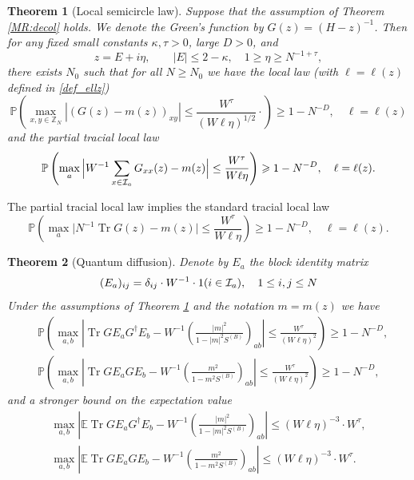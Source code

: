 \documentclass[10pt,reqno]{article}
\DeclareMathOperator{\tr}{Tr}
\theoremstyle{plain} %
\newtheorem{theorem}{Theorem}[section]
\theoremstyle{remark}
\numberwithin{equation}{section}
\begin{document}
 
\begin{theorem}[Local semicircle law]\label{MR:locSC} Suppose that  the assumption of Theorem \ref{MR:decol} holds. We denote the Green's function by 
$ G(z)=(H-z)^{-1}$. 
Then for 
 any fixed small constants $\kappa, \tau>0$, large $D>0$, and 
$$z=E+i\eta,\quad\quad |E|\le  2-\kappa, \quad 1\ge \eta\ge N^{-1+\tau},
$$
there exists $N_0$ such that for all $N \geqslant N_0$  we have the  local law (with $\ell=\ell(z)$ defined in \eqref{def_ellz})
\begin{equation}\label{G_bound}
   \mathbb P\left( \max_{x,y\in \mathbb Z_N}  \left|\left(G(z)-m(z)\right)_{xy}\right|\le  \frac{W^\tau}{(W\ell\eta)^{ 1/2}}\cdot \right)\geqslant 1-N^{-D},\quad \ell=\ell(z) 
\end{equation}
and the partial   tracial  local law
\begin{equation}\label{G_bound_ave}
\mathbb{P}\left(\max_a\Big| W^{-1}\sum_{x\in {\cal I}_a}G_{xx}(z)-m(z) \Big| \le \frac{W^\tau}{W\ell\eta} \right)\geqslant 1-N^{-D},\quad \ell=\ell(z). 
\end{equation}

\end{theorem}
The partial tracial  local law implies  the standard tracial local law 
 $$
\mathbb{P}\left(\max_a\Big| N^{-1}\tr G(z)-m(z) \Big| \le \frac{W^\tau}{W\ell\eta}  \right)\geqslant 1-N^{-D},\quad \ell=\ell(z) . 
$$




\begin{theorem}[Quantum diffusion]\label{MR:QDiff}
Denote by  $E_a$ the  block identity matrix 
\begin{equation}\label{Def_matE}
(E_a)_{ij}=  \delta_{ij}\cdot W^{-1}\cdot\textbf{1}(i\in {\cal I}_a),\quad 1\le i,j\le N
\end{equation}
Under the assumptions of Theorem \ref{MR:locSC} and the notation $m=m(z)$ we have 
 \begin{align}\label{Meq:QdW1}
 &
 \mathbb P\left(\max_{a,b }   \left|\tr G E_a G^\dagger E_b- W^{-1}\left(\frac{|m|^2}{1-|m|^2 S^{(B)}} \right)_{ab}\right|\le\frac{W^\tau}{ \left(W \ell\eta\right)^{ 2}}\right)\ge 1-N^{-D},
 \\ \label{Meq:QdW2}
 &
 \mathbb P\left( \max_{a,b }   \left|\tr G E_a G  E_b- W^{-1}\left(\frac{m^2}{1-m^2 S^{(B)}} \right)_{ab}\right|\le\frac{W^\tau}{ \left(W \ell\eta\right)^{ 2}}\right)\ge 1-N^{-D},
\end{align}
and a stronger bound on the expectation value 
\begin{align}\label{Meq:QdS1}
 \max_{a,b }   \left|\mathbb E\tr G E_a G^\dagger E_b- W^{-1}\left(\frac{|m|^2}{1-|m|^2 S^{(B)}} \right)_{ab}\right|\le  \left(W \ell\eta\right)^{-3} \cdot W^\tau,   \\
 \label{Meq:QdS2}
 \max_{a,b }   \left|\mathbb E\tr G E_a G  E_b- W^{-1}\left(\frac{m^2}{1-m^2 S^{(B)}} \right)_{ab}\right|\le \left(W \ell\eta\right)^{-3} \cdot W^\tau   .
\end{align}
 
\end{theorem}
\end{document}
